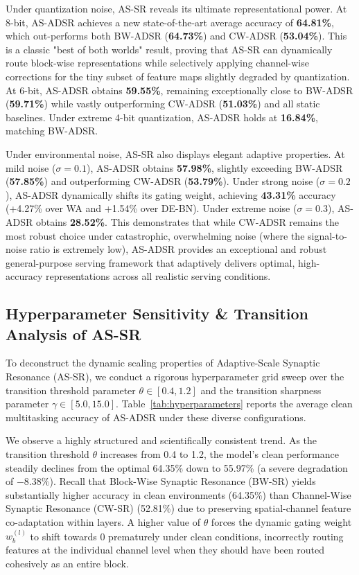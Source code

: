 \documentclass{article}
\theoremstyle{plain}
\theoremstyle{definition}
\theoremstyle{remark}
\begin{document}
Under quantization noise, AS-SR reveals its ultimate representational power. At 8-bit, AS-ADSR achieves a new state-of-the-art average accuracy of \textbf{64.81\%}, which out-performs both BW-ADSR (\textbf{64.73\%}) and CW-ADSR (\textbf{53.04\%}). This is a classic "best of both worlds" result, proving that AS-SR can dynamically route block-wise representations while selectively applying channel-wise corrections for the tiny subset of feature maps slightly degraded by quantization. At 6-bit, AS-ADSR obtains \textbf{59.55\%}, remaining exceptionally close to BW-ADSR (\textbf{59.71\%}) while vastly outperforming CW-ADSR (\textbf{51.03\%}) and all static baselines. Under extreme 4-bit quantization, AS-ADSR holds at \textbf{16.84\%}, matching BW-ADSR.

Under environmental noise, AS-SR also displays elegant adaptive properties. At mild noise ($\sigma = 0.1$), AS-ADSR obtains \textbf{57.98\%}, slightly exceeding BW-ADSR (\textbf{57.85\%}) and outperforming CW-ADSR (\textbf{53.79\%}). Under strong noise ($\sigma = 0.2$), AS-ADSR dynamically shifts its gating weight, achieving \textbf{43.31\%} accuracy (+4.27\% over WA and +1.54\% over DE-BN). Under extreme noise ($\sigma = 0.3$), AS-ADSR obtains \textbf{28.52\%}. This demonstrates that while CW-ADSR remains the most robust choice under catastrophic, overwhelming noise (where the signal-to-noise ratio is extremely low), AS-ADSR provides an exceptional and robust general-purpose serving framework that adaptively delivers optimal, high-accuracy representations across all realistic serving conditions.

\subsection{Hyperparameter Sensitivity \& Transition Analysis of AS-SR}
To deconstruct the dynamic scaling properties of Adaptive-Scale Synaptic Resonance (AS-SR), we conduct a rigorous hyperparameter grid sweep over the transition threshold parameter $\theta \in [0.4, 1.2]$ and the transition sharpness parameter $\gamma \in [5.0, 15.0]$. Table~\ref{tab:hyperparameters} reports the average clean multitasking accuracy of AS-ADSR under these diverse configurations.

We observe a highly structured and scientifically consistent trend. As the transition threshold $\theta$ increases from 0.4 to 1.2, the model's clean performance steadily declines from the optimal 64.35\% down to 55.97\% (a severe degradation of $-8.38\%$). Recall that Block-Wise Synaptic Resonance (BW-SR) yields substantially higher accuracy in clean environments (64.35\%) than Channel-Wise Synaptic Resonance (CW-SR) (52.81\%) due to preserving spatial-channel feature co-adaptation within layers. A higher value of $\theta$ forces the dynamic gating weight $w_b^{(l)}$ to shift towards 0 prematurely under clean conditions, incorrectly routing features at the individual channel level when they should have been routed cohesively as an entire block.
\end{document}
